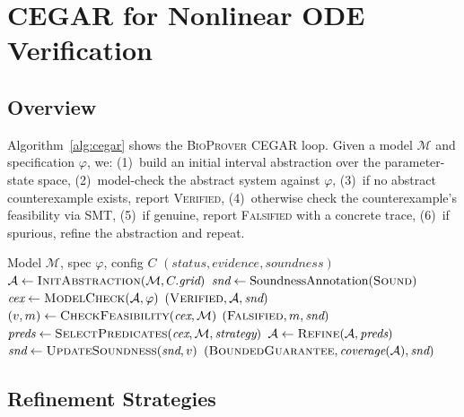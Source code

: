 \documentclass[11pt]{article}
\newcommand{\bioprover}{\textsc{BioProver}}
\newcommand{\cegar}{\textsc{CEGAR}}
\begin{document}
\section{CEGAR for Nonlinear ODE Verification}
\label{sec:cegar}

\subsection{Overview}

Algorithm~\ref{alg:cegar} shows the \bioprover{} \cegar{} loop.
Given a model $\mathcal{M}$ and specification $\varphi$, we:
(1)~build an initial interval abstraction over the parameter-state
space, (2)~model-check the abstract system against $\varphi$,
(3)~if no abstract counterexample exists, report \textsc{Verified},
(4)~otherwise check the counterexample's feasibility via SMT,
(5)~if genuine, report \textsc{Falsified} with a concrete trace,
(6)~if spurious, refine the abstraction and repeat.

\begin{algorithm}[t]
\caption{\bioprover{} \cegar{} loop}
\label{alg:cegar}
\begin{algorithmic}[1]
\Require Model $\mathcal{M}$, spec $\varphi$, config $C$
\Ensure $(\textit{status}, \textit{evidence}, \textit{soundness})$
\State $\mathcal{A} \gets \textsc{InitAbstraction}(\mathcal{M}, C.\textit{grid})$
\State $\textit{snd} \gets \text{SoundnessAnnotation}(\textsc{Sound})$
  \State $\textit{cex} \gets \textsc{ModelCheck}(\mathcal{A}, \varphi)$
   \Return $(\textsc{Verified}, \mathcal{A}, \textit{snd})$
  \EndIf
  \State $(v, m) \gets \textsc{CheckFeasibility}(\textit{cex}, \mathcal{M})$
   \Return $(\textsc{Falsified}, m, \textit{snd})$
  \EndIf
  \State $\textit{preds} \gets \textsc{SelectPredicates}(\textit{cex}, \mathcal{M}, \textit{strategy})$
  \State $\mathcal{A} \gets \textsc{Refine}(\mathcal{A}, \textit{preds})$
  \State $\textit{snd} \gets \textsc{UpdateSoundness}(\textit{snd}, v)$
\EndFor
\State \Return $(\textsc{BoundedGuarantee}, \textit{coverage}(\mathcal{A}), \textit{snd})$
\end{algorithmic}
\end{algorithm}

\subsection{Refinement Strategies}
\label{sec:refinement}
\end{document}
